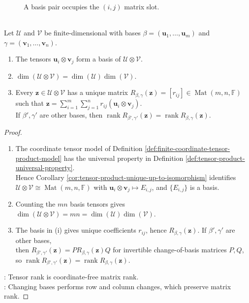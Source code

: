 \begin{figure}[H]
  \centering
  
  \caption{A basis pair occupies the $(i,j)$ matrix slot.}
  \label{fig:tensor-product-matrix-basis}
\end{figure}

\begin{theorem} \label{thm:tensor-bases-dimension-and-rank} \\
Let $\mathcal{U}$ and $\mathcal{V}$ be finite-dimensional with bases $\beta=(\mathbf{u}_1,\ldots,\mathbf{u}_m)$ and $\gamma=(\mathbf{v}_1,\ldots,\mathbf{v}_n)$.
\begin{enumerate}[label=(\roman*)]
\setlength{\itemsep}{0pt}
\item The tensors $\mathbf{u}_i\otimes\mathbf{v}_j$ form a basis of $\mathcal{U}\otimes\mathcal{V}$.
\item $\dim(\mathcal{U}\otimes\mathcal{V})=\dim(\mathcal{U})\dim(\mathcal{V})$.
\item Every $\mathbf{z}\in\mathcal{U}\otimes\mathcal{V}$ has a unique matrix $R_{\beta,\gamma}(\mathbf{z})=[r_{ij}]\in\operatorname{Mat}(m,n,\mathbb{F})$ such that $\mathbf{z}=\sum\limits_{i=1}^{m}\sum\limits_{j=1}^{n} r_{ij}(\mathbf{u}_i\otimes\mathbf{v}_j)$.\\
If $\beta',\gamma'$ are other bases, then $\operatorname{rank}R_{\beta',\gamma'}(\mathbf{z})=\operatorname{rank}R_{\beta,\gamma}(\mathbf{z})$.
\end{enumerate}
\begin{proof}
\begin{enumerate}[label=(\roman*)]
\setlength{\itemsep}{0pt}
\item The coordinate tensor model of Definition \ref{def:finite-coordinate-tensor-product-model} has the universal property in Definition \ref{def:tensor-product-universal-property}.\\
Hence Corollary \ref{cor:tensor-product-unique-up-to-isomorphism} identifies $\mathcal{U}\otimes\mathcal{V}\cong\operatorname{Mat}(m,n,\mathbb{F})$ with $\mathbf{u}_i\otimes\mathbf{v}_j\mapsto E_{i,j}$, and $\{E_{i,j}\}$ is a basis.
\item Counting the $mn$ basis tensors gives $\dim(\mathcal{U}\otimes\mathcal{V})=mn=\dim(\mathcal{U})\dim(\mathcal{V})$.
\item The basis in (i) gives unique coefficients $r_{ij}$, hence $R_{\beta,\gamma}(\mathbf{z})$. If $\beta',\gamma'$ are other bases,\\
then $R_{\beta',\gamma'}(\mathbf{z})=P R_{\beta,\gamma}(\mathbf{z})Q$ for invertible change-of-basis matrices $P,Q$, so $\operatorname{rank}R_{\beta',\gamma'}(\mathbf{z})=\operatorname{rank}R_{\beta,\gamma}(\mathbf{z})$.
\end{enumerate}
: Tensor rank is coordinate-free matrix rank.\\
: Changing bases performs row and column changes, which preserve matrix rank.
\end{proof}
\end{theorem}

